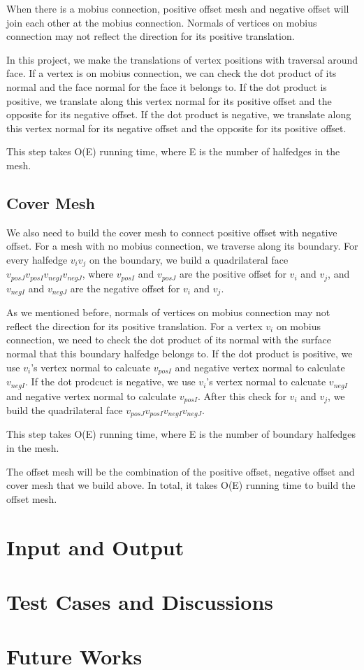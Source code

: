 \documentclass[12pt]{article}
\begin{document}
When there is a mobius connection, positive offset mesh and negative offset will join each other at the mobius connection. Normals of vertices on mobius connection may not reflect the direction for its positive translation. 

In this project, we make the translations of vertex positions with traversal around face. If a vertex is on mobius connection, we can check the dot product of its normal and the face normal for the face it belongs to. If the dot product is positive, we translate along this vertex normal for its positive offset and the opposite for its negative offset. If the dot product is negative, we translate along this vertex normal for its negative offset and the opposite for its positive offset.

This step takes O(E) running time, where E is the number of halfedges in the mesh.

\subsection{Cover Mesh}

We also need to build the cover mesh to connect positive offset with negative offset. For a mesh with no mobius connection, we traverse along its boundary. For every halfedge $v_iv_j$ on the boundary, we build a quadrilateral face $v_{posJ}v_{posI}v_{negI}v_{negJ}$, where $v_{posI}$ and $v_{posJ}$ are the positive offset for $v_i$ and $v_j$, and $v_{negI}$ and $v_{negJ}$ are the negative offset for $v_i$ and $v_j$.

As we mentioned before, normals of vertices on mobius connection may not reflect the direction for its positive translation. For a vertex $v_i$ on mobius connection, we need to check the dot product of its normal with the surface normal that this boundary halfedge belongs to. If the dot product is positive, we use $v_i$'s vertex normal to calcuate $v_{posI}$ and negative vertex normal to calculate $v_{negI}$. If the dot prodcuct is negative, we use $v_i$'s vertex normal to calcuate $v_{negI}$ and negative vertex normal to calculate $v_{posI}$. After this check for $v_i$ and $v_j$, we build the quadrilateral face $v_{posJ}v_{posI}v_{negI}v_{negJ}$.

This step takes O(E) running time, where E is the number of boundary halfedges in the mesh.

The offset mesh will be the combination of the positive offset, negative offset and cover mesh that we build above. In total, it takes O(E) running time to build the offset mesh.

\section{Input and Output}

\section{Test Cases and Discussions}

\section{Future Works}
\end{document}
